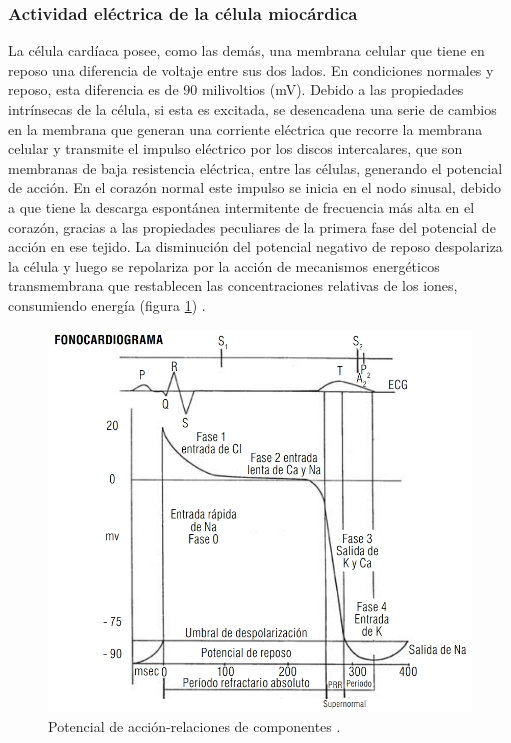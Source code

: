 \documentclass[spanish,11pt,letterpaper,oneside]{memoir}
\begin{document}
	\subsubsection*{Actividad eléctrica de la célula miocárdica}
	La célula cardíaca posee, como las demás, una membrana celular que tiene en reposo una diferencia de voltaje entre sus dos lados. En condiciones normales y reposo, esta diferencia es de 90 milivoltios (mV). Debido a las propiedades intrínsecas de la célula, si esta es excitada, se desencadena una serie de cambios en la membrana que generan una corriente eléctrica que recorre la membrana celular y transmite el impulso eléctrico por los discos intercalares, que son membranas de baja resistencia eléctrica, entre las células, generando el potencial de acción. En el corazón normal este impulso se inicia en el nodo sinusal, debido a que tiene la descarga espontánea intermitente de frecuencia más alta en el corazón, gracias a las propiedades peculiares de la primera fase del potencial de acción en ese tejido. La disminución del potencial negativo de reposo despolariza la célula y luego se repolariza por la acción de mecanismos energéticos transmembrana que restablecen las concentraciones relativas de los iones, consumiendo energía (figura \ref{fig:fonocardio}) \cite{textCardi}.
	\begin{figure}[h]
		\centering
		\includegraphics[width=0.8\linewidth]{Sem_1/figuras/fonocardiograma.jpeg}
		\caption{Potencial de acción-relaciones de componentes \cite{textCardi}.}
		\label{fig:fonocardio}
	\end{figure}
	
\end{document}
